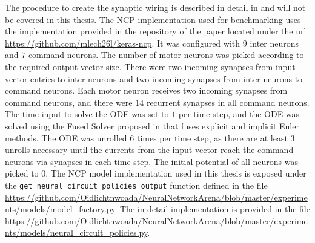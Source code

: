 \documentclass[draft,final]{vutinfth} %
\begin{document}
    The procedure to create the synaptic wiring is described in detail in \cite[p. 3]{NCP} and will not be covered in this thesis.
    The NCP implementation used for benchmarking uses the implementation provided in the repository of the paper \cite{NCP} located under the url \url{https://github.com/mlech26l/keras-ncp}.
    It was configured with $9$ inter neurons and $7$ command neurons. The number of motor neurons was picked according to the required output vector size.
    There were two incoming synapses from input vector entries to inter neurons and two incoming synapses from inter neurons to command neurons.
    Each motor neuron receives two incoming synapses from command neurons, and there were $14$ recurrent synapses in all command neurons.
    The time input to solve the ODE was set to $1$ per time step, and the ODE was solved using the Fused Solver proposed in \cite{LTCNetworks} that fuses explicit and implicit Euler methods.
    The ODE was unrolled $6$ times per time step, as there are at least $3$ unrolls necessary until the currents from the input vector reach the command neurons via synapses in each time step.
    The initial potential of all neurons was picked to $0$.
    The NCP model implementation used in this thesis is exposed under the \texttt{get\_neural\_circuit\_policies\_output} function defined in the file \url{https://github.com/Oidlichtnwoada/NeuralNetworkArena/blob/master/experiments/models/model_factory.py}.
    The in-detail implementation is provided in the file \url{https://github.com/Oidlichtnwoada/NeuralNetworkArena/blob/master/experiments/models/neural_circuit_policies.py}.
\end{document}
